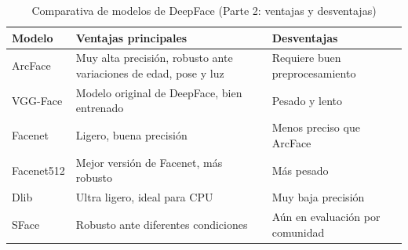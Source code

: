 \vspace{0.5cm}

\begin{table}[H]
    \centering
    \caption{Comparativa de modelos de DeepFace (Parte 2: ventajas y desventajas)}
    \label{tab:deepface2}
    \renewcommand{\arraystretch}{1.3}
    \scriptsize
    \begin{tabular}{|p{2.3cm}|p{5cm}|p{5cm}|}
        \hline
        \textbf{Modelo} & \textbf{Ventajas principales} & \textbf{Desventajas} \\
        \hline
        ArcFace & Muy alta precisión, robusto ante variaciones de edad, pose y luz & Requiere buen preprocesamiento \\
        \hline
        VGG-Face & Modelo original de DeepFace, bien entrenado & Pesado y lento \\
        \hline
        Facenet & Ligero, buena precisión & Menos preciso que ArcFace \\
        \hline
        Facenet512 & Mejor versión de Facenet, más robusto & Más pesado \\
        \hline
        Dlib & Ultra ligero, ideal para CPU & Muy baja precisión \\
        \hline
        SFace & Robusto ante diferentes condiciones & Aún en evaluación por comunidad \\
        \hline
    \end{tabular}
\end{table}

